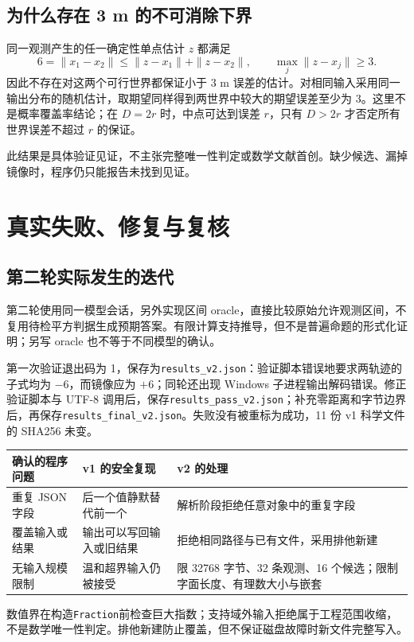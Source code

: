 \documentclass[UTF8,a4paper,zihao=-4,fontset=none]{ctexart}
\newcommand{\code}[1]{{\small\nolinkurl{#1}}}
\begin{document}
\subsection{为什么存在 3 m 的不可消除下界}
同一观测产生的任一确定性单点估计 $z$ 都满足
\[
6=\|x_1-x_2\|\le\|z-x_1\|+\|z-x_2\|,
\qquad \max_j\|z-x_j\|\ge3.
\]
因此不存在对这两个可行世界都保证小于 3 m 误差的估计。对相同输入采用同一输出分布的随机估计，取期望同样得到两世界中较大的期望误差至少为 3。这里不是概率覆盖率结论；在 $D=2r$ 时，中点可达到误差 $r$，只有 $D>2r$ 才否定所有世界误差不超过 $r$ 的保证。

此结果是具体验证见证，不主张完整唯一性判定或数学文献首创。缺少候选、漏掉镜像时，程序仍只能报告未找到见证。

\newpage
\section{真实失败、修复与复核}
\subsection{第二轮实际发生的迭代}
第二轮使用同一模型会话，另外实现区间 oracle，直接比较原始允许观测区间，不复用待检平方判据生成预期答案。有限计算支持推导，但不是普遍命题的形式化证明；另写 oracle 也不等于不同模型的确认。

第一次验证退出码为 1，保存为\code{results_v2.json}：验证脚本错误地要求两轨迹的子式均为 $-6$，而镜像应为 $+6$；同轮还出现 Windows 子进程输出解码错误。修正验证脚本与 UTF-8 调用后，保存\code{results_pass_v2.json}；补充零距离和字节边界后，再保存\code{results_final_v2.json}。失败没有被重标为成功，11 份 v1 科学文件的 SHA256 未变。

\noindent\begin{tabularx}{\textwidth}{@{}p{30mm}YY@{}}
\toprule
确认的程序问题 & v1 的安全复现 & v2 的处理 \\
\midrule
重复 JSON 字段 & 后一个值静默替代前一个 & 解析阶段拒绝任意对象中的重复字段 \\[4pt]
覆盖输入或结果 & 输出可以写回输入或旧结果 & 拒绝相同路径与已有文件，采用排他新建 \\[4pt]
无输入规模限制 & 温和超界输入仍被接受 & 限 32768 字节、32 条观测、16 个候选；限制字面长度、有理数大小与嵌套 \\
\bottomrule
\end{tabularx}
数值界在构造\code{Fraction}前检查巨大指数；支持域外输入拒绝属于工程范围收缩，不是数学唯一性判定。排他新建防止覆盖，但不保证磁盘故障时新文件完整写入。
\end{document}
